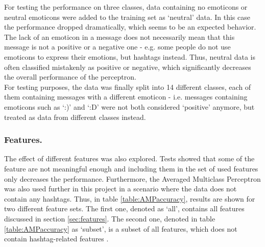 \noindent For testing the performance on three classes, data containing no emoticons or neutral emoticons were added to the training set as `neutral' data. In this case the performance dropped dramatically, which seems to be an expected behavior. The lack of an emoticon in a message does not necessarily mean that this message is not a positive or a negative one - e.g. some people do not use emoticons to express their emotions, but hashtags instead. Thus, neutral data is often classified mistakenly as positive or negative, which significantly decreases the overall performance of the perceptron. \\

\noindent For testing purposes, the data was finally split into 14 different classes, each of them containing messages with a different emoticon - i.e. messages containing emoticons such as `:)' and `:D' were not both considered `positive' anymore, but treated as data from different classes instead. 


\subsubsection*{Features.}

The effect of different features was also explored. Tests showed that some of the feature are not meaningful enough and including them in the set of used features only decreases the performance. Furthermore, the Averaged Multiclass Perceptron was also used further in this project in a scenario where the data does not contain any hashtags. Thus, in table \ref{table:AMPaccuracy}, results are shown for two different feature sets. The first one, denoted as `all', contains all features discussed in section \ref{sec:features}.
The second one, denoted in table \ref{table:AMPaccuracy} as `subset', is a subset of all features, which does not contain hashtag-related features .

